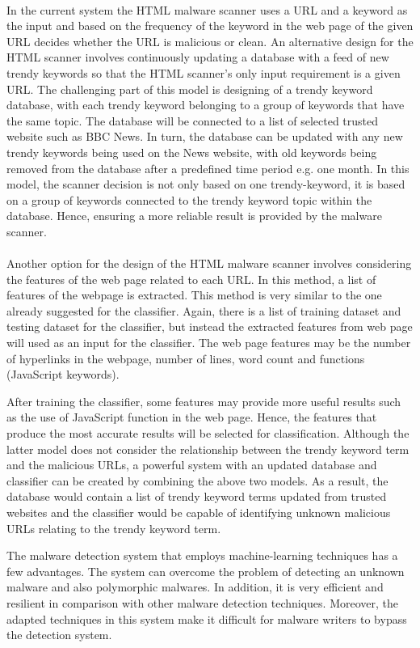 \paragraph{}
In the current system the HTML malware scanner uses a URL and a keyword as the input and based on the frequency of the keyword in the web page of the given URL decides whether the URL is malicious or clean. An alternative design for the HTML scanner involves continuously updating a database with a feed of new trendy keywords so that the HTML scanner’s only input requirement is a given URL. The challenging part of this model is designing of a trendy keyword database, with each trendy keyword belonging to a group of keywords that have the same topic. The database will be connected to a list of selected trusted website such as BBC News. In turn, the database can be updated with any new trendy keywords being used on the News website, with old keywords being removed from the database after a predefined time period e.g. one month. In this model, the scanner decision is not only based on one trendy-keyword, it is based on a group of keywords connected to the trendy keyword topic within the database. Hence, ensuring a more reliable result is provided by the malware scanner.

\paragraph{}
Another option for the design of the HTML malware scanner involves considering the features of the web page related to each URL. In this method, a list of features of the webpage is extracted. This method is very similar to the one already suggested for the classifier. Again, there is a list of training dataset and testing dataset for the classifier, but instead the extracted features from web page will used as an input for the classifier. The web page features may be the number of hyperlinks in the webpage, number of lines, word count and functions (JavaScript keywords).

After training the classifier, some features may provide more useful results such as the use of JavaScript function in the web page. Hence, the features that produce the most accurate results will be selected for classification. Although the latter model does not consider the relationship between the trendy keyword term and the malicious URLs, a powerful system with an updated database and classifier can be created by combining the above two models. As a result, the database would contain a list of trendy keyword terms updated from trusted websites and the classifier would be capable of identifying unknown malicious URLs relating to the trendy keyword term.

The malware detection system that employs machine-learning techniques has a few advantages. The system can overcome the problem of detecting an unknown malware and also polymorphic malwares. In addition, it is very efficient and resilient in comparison with other malware detection techniques. Moreover, the adapted techniques in this system make it difficult for malware writers to bypass the detection system. 





